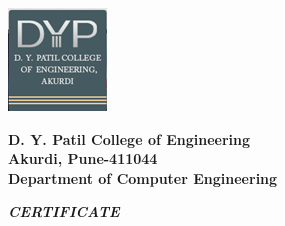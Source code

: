 \begin{center}
\includegraphics[scale=1]{newlogo.png} 	
\end{center}

\begin{center}

\textbf{D. Y. Patil College of Engineering}\\
\centering\textbf{Akurdi, Pune-411044}\\
\centering\textbf{Department of Computer Engineering}\\
\end{center}


\begin{center}


{\textbf{\textit{\LARGE CERTIFICATE}}}
\\

\end{center}

